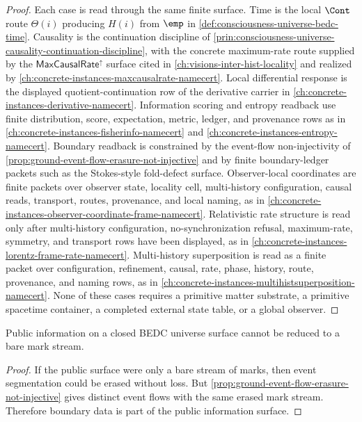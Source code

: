 \begin{proof}
Each case is read through the same finite surface. Time is the local $\Cont$ route $\Theta(i)$ producing $H(i)$ from $\emp$ in \autoref{def:consciousness-universe-bedc-time}. Causality is the continuation discipline of \autoref{prin:consciousness-universe-causality-continuation-discipline}, with the concrete maximum-rate route supplied by the $\mathsf{MaxCausalRate}^{\uparrow}$ surface cited in \autoref{ch:visions-inter-hist-locality} and realized by \autoref{ch:concrete-instances-maxcausalrate-namecert}. Local differential response is the displayed quotient-continuation row of the derivative carrier in \autoref{ch:concrete-instances-derivative-namecert}. Information scoring and entropy readback use finite distribution, score, expectation, metric, ledger, and provenance rows as in \autoref{ch:concrete-instances-fisherinfo-namecert} and \autoref{ch:concrete-instances-entropy-namecert}. Boundary readback is constrained by the event-flow non-injectivity of \autoref{prop:ground-event-flow-erasure-not-injective} and by finite boundary-ledger packets such as the Stokes-style fold-defect surface. Observer-local coordinates are finite packets over observer state, locality cell, multi-history configuration, causal reads, transport, routes, provenance, and local naming, as in \autoref{ch:concrete-instances-observer-coordinate-frame-namecert}. Relativistic rate structure is read only after multi-history configuration, no-synchronization refusal, maximum-rate, symmetry, and transport rows have been displayed, as in \autoref{ch:concrete-instances-lorentz-frame-rate-namecert}. Multi-history superposition is read as a finite packet over configuration, refinement, causal, rate, phase, history, route, provenance, and naming rows, as in \autoref{ch:concrete-instances-multihistsuperposition-namecert}. None of these cases requires a primitive matter substrate, a primitive spacetime container, a completed external state table, or a global observer.
\end{proof}

\begin{corollary}
\label{cor:consciousness-universe-boundary-sensitive-information}
Public information on a closed BEDC universe surface cannot be reduced to a bare mark stream.
\end{corollary}

\begin{proof}
If the public surface were only a bare stream of marks, then event segmentation could be erased without loss. But \autoref{prop:ground-event-flow-erasure-not-injective} gives distinct event flows with the same erased mark stream. Therefore boundary data is part of the public information surface.
\end{proof}

